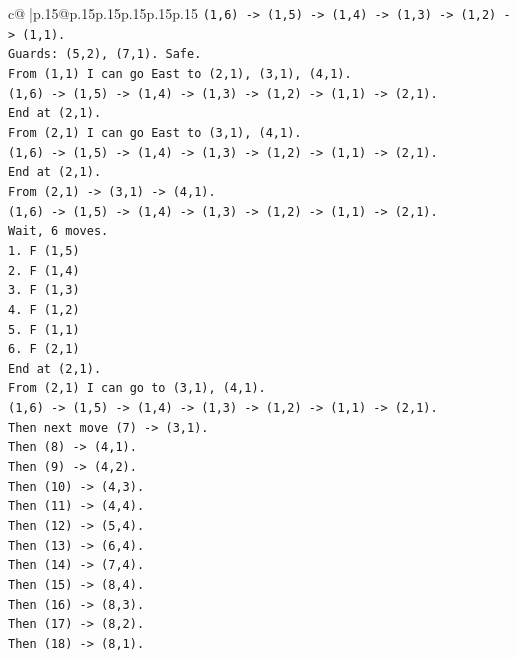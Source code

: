 \documentclass{article}
\begin{document}
{\begin{supertabular}{c@{$\;$}|p{.15\linewidth}@{}p{.15\linewidth}p{.15\linewidth}p{.15\linewidth}p{.15\linewidth}p{.15\linewidth}}
{{{\texttt{(1,6) {-}> (1,5) {-}> (1,4) {-}> (1,3) {-}> (1,2) {-}> (1,1).} \\
\texttt{Guards: (5,2), (7,1). Safe.} \\
\texttt{From (1,1) I can go East to (2,1), (3,1), (4,1).} \\
\texttt{(1,6) {-}> (1,5) {-}> (1,4) {-}> (1,3) {-}> (1,2) {-}> (1,1) {-}> (2,1).} \\
\texttt{End at (2,1).} \\
\texttt{From (2,1) I can go East to (3,1), (4,1).} \\
\texttt{(1,6) {-}> (1,5) {-}> (1,4) {-}> (1,3) {-}> (1,2) {-}> (1,1) {-}> (2,1).} \\
\texttt{End at (2,1).} \\
\texttt{From (2,1) {-}> (3,1) {-}> (4,1).} \\
\texttt{(1,6) {-}> (1,5) {-}> (1,4) {-}> (1,3) {-}> (1,2) {-}> (1,1) {-}> (2,1).} \\
\texttt{Wait, 6 moves.} \\
\texttt{1. F (1,5)} \\
\texttt{2. F (1,4)} \\
\texttt{3. F (1,3)} \\
\texttt{4. F (1,2)} \\
\texttt{5. F (1,1)} \\
\texttt{6. F (2,1)} \\
\texttt{End at (2,1).} \\
\texttt{From (2,1) I can go to (3,1), (4,1).} \\
\texttt{(1,6) {-}> (1,5) {-}> (1,4) {-}> (1,3) {-}> (1,2) {-}> (1,1) {-}> (2,1).} \\
\texttt{Then next move (7) {-}> (3,1).} \\
\texttt{Then (8) {-}> (4,1).} \\
\texttt{Then (9) {-}> (4,2).} \\
\texttt{Then (10) {-}> (4,3).} \\
\texttt{Then (11) {-}> (4,4).} \\
\texttt{Then (12) {-}> (5,4).} \\
\texttt{Then (13) {-}> (6,4).} \\
\texttt{Then (14) {-}> (7,4).} \\
\texttt{Then (15) {-}> (8,4).} \\
\texttt{Then (16) {-}> (8,3).} \\
\texttt{Then (17) {-}> (8,2).} \\
\texttt{Then (18) {-}> (8,1).} \\
}}}
\end{supertabular}}
\end{document}
